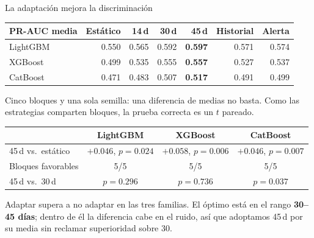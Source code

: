\documentclass[aspectratio=169,10pt]{beamer}
\begin{document}
\begin{frame}{La adaptación mejora la discriminación}\small
\begin{center}
\begin{tabular}{@{}lrrrrrr@{}}\toprule
PR-AUC media & Estático & 14\,d & 30\,d & 45\,d & Historial & Alerta\\\midrule
LightGBM & 0.550 & 0.565 & 0.592 & \textbf{0.597} & 0.571 & 0.574\\
XGBoost & 0.499 & 0.535 & 0.555 & \textbf{0.557} & 0.527 & 0.537\\
CatBoost & 0.471 & 0.483 & 0.507 & \textbf{0.517} & 0.491 & 0.499\\\bottomrule
\end{tabular}
\end{center}
\vspace{2mm}
Cinco bloques y una sola semilla: una diferencia de medias no basta. Como las estrategias comparten bloques, la prueba correcta es un $t$ pareado.
\begin{center}\small
\begin{tabular}{@{}lccc@{}}\toprule
 & LightGBM & XGBoost & CatBoost\\\midrule
45\,d vs.\ estático & $+0.046$, $p=\mathbf{0.024}$ & $+0.058$, $p=\mathbf{0.006}$ & $+0.046$, $p=\mathbf{0.007}$\\
Bloques favorables & 5/5 & 5/5 & 5/5\\
45\,d vs.\ 30\,d & $p=0.296$ & $p=0.736$ & $p=0.037$\\\bottomrule
\end{tabular}
\end{center}
\vspace{1mm}
\footnotesize Adaptar supera a no adaptar en las tres familias. El óptimo está en el rango \textbf{30--45 días}; dentro de él la diferencia cabe en el ruido, así que adoptamos 45\,d por su media sin reclamar superioridad sobre 30.
\end{frame}
\end{document}
